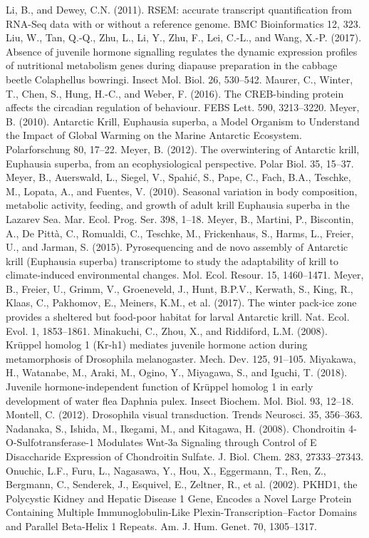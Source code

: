 Li, B., and Dewey, C.N. (2011). RSEM: accurate transcript quantification from RNA-Seq data with or without a reference genome. BMC Bioinformatics 12, 323.
Liu, W., Tan, Q.-Q., Zhu, L., Li, Y., Zhu, F., Lei, C.-L., and Wang, X.-P. (2017). Absence of juvenile hormone signalling regulates the dynamic expression profiles of nutritional metabolism genes during diapause preparation in the cabbage beetle Colaphellus bowringi. Insect Mol. Biol. 26, 530–542.
Maurer, C., Winter, T., Chen, S., Hung, H.-C., and Weber, F. (2016). The CREB-binding protein affects the circadian regulation of behaviour. FEBS Lett. 590, 3213–3220.
Meyer, B. (2010). Antarctic Krill, Euphausia superba, a Model Organism to Understand the Impact of Global Warming on the Marine Antarctic Ecosystem. Polarforschung 80, 17–22.
Meyer, B. (2012). The overwintering of Antarctic krill, Euphausia superba, from an ecophysiological perspective. Polar Biol. 35, 15–37.
Meyer, B., Auerswald, L., Siegel, V., Spahić, S., Pape, C., Fach, B.A., Teschke, M., Lopata, A., and Fuentes, V. (2010). Seasonal variation in body composition, metabolic activity, feeding, and growth of adult krill Euphausia superba in the Lazarev Sea. Mar. Ecol. Prog. Ser. 398, 1–18.
Meyer, B., Martini, P., Biscontin, A., De Pittà, C., Romualdi, C., Teschke, M., Frickenhaus, S., Harms, L., Freier, U., and Jarman, S. (2015). Pyrosequencing and de novo assembly of Antarctic krill (Euphausia superba) transcriptome to study the adaptability of krill to climate‐induced environmental changes. Mol. Ecol. Resour. 15, 1460–1471.
Meyer, B., Freier, U., Grimm, V., Groeneveld, J., Hunt, B.P.V., Kerwath, S., King, R., Klaas, C., Pakhomov, E., Meiners, K.M., et al. (2017). The winter pack-ice zone provides a sheltered but food-poor habitat for larval Antarctic krill. Nat. Ecol. Evol. 1, 1853–1861.
Minakuchi, C., Zhou, X., and Riddiford, L.M. (2008). Krüppel homolog 1 (Kr-h1) mediates juvenile hormone action during metamorphosis of Drosophila melanogaster. Mech. Dev. 125, 91–105.
Miyakawa, H., Watanabe, M., Araki, M., Ogino, Y., Miyagawa, S., and Iguchi, T. (2018). Juvenile hormone-independent function of Krüppel homolog 1 in early development of water flea Daphnia pulex. Insect Biochem. Mol. Biol. 93, 12–18.
Montell, C. (2012). Drosophila visual transduction. Trends Neurosci. 35, 356–363.
Nadanaka, S., Ishida, M., Ikegami, M., and Kitagawa, H. (2008). Chondroitin 4-O-Sulfotransferase-1 Modulates Wnt-3a Signaling through Control of E Disaccharide Expression of Chondroitin Sulfate. J. Biol. Chem. 283, 27333–27343.
Onuchic, L.F., Furu, L., Nagasawa, Y., Hou, X., Eggermann, T., Ren, Z., Bergmann, C., Senderek, J., Esquivel, E., Zeltner, R., et al. (2002). PKHD1, the Polycystic Kidney and Hepatic Disease 1 Gene, Encodes a Novel Large Protein Containing Multiple Immunoglobulin-Like Plexin-Transcription–Factor Domains and Parallel Beta-Helix 1 Repeats. Am. J. Hum. Genet. 70, 1305–1317.

